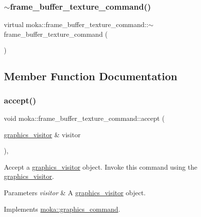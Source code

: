 \subsubsection{\texorpdfstring{$\sim$frame\_buffer\_texture\_command()}{~frame\_buffer\_texture\_command()}}
{\footnotesize\ttfamily virtual moka\+::frame\+\_\+buffer\+\_\+texture\+\_\+command\+::$\sim$frame\+\_\+buffer\+\_\+texture\+\_\+command (\begin{DoxyParamCaption}{ }\end{DoxyParamCaption})\hspace{0.3cm}{\ttfamily [virtual]}}



\subsection{Member Function Documentation}
\mbox{\label{classmoka_1_1frame__buffer__texture__command_a13187e36d3002ccdaa39c42b40d0034f}} 
\subsubsection{\texorpdfstring{accept()}{accept()}}
{\footnotesize\ttfamily void moka\+::frame\+\_\+buffer\+\_\+texture\+\_\+command\+::accept (\begin{DoxyParamCaption}\item[{\mbox{\hyperlink{classmoka_1_1graphics__visitor}{graphics\+\_\+visitor}} \&}]{visitor }\end{DoxyParamCaption})\hspace{0.3cm}{\ttfamily [override]}, {\ttfamily [virtual]}}



Accept a \mbox{\hyperlink{classmoka_1_1graphics__visitor}{graphics\+\_\+visitor}} object. Invoke this command using the \mbox{\hyperlink{classmoka_1_1graphics__visitor}{graphics\+\_\+visitor}}. 


\begin{DoxyParams}{Parameters}
{\em visitor} & A \mbox{\hyperlink{classmoka_1_1graphics__visitor}{graphics\+\_\+visitor}} object. \\
\hline
\end{DoxyParams}


Implements \mbox{\hyperlink{classmoka_1_1graphics__command_a7affaeceb1019ab358c62185bce4e654}{moka\+::graphics\+\_\+command}}.

